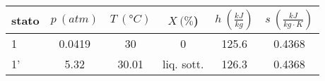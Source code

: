 \begin{center}
    \begin{tabular}{l|c|c|c|c|c}
        stato    & $p\ (atm)$ & $T\ (\text{°}C) $&$X\ (\%$)& $h\ (\frac{kJ}{kg})$  & $s\ (\frac{kJ}{kg\cdot K})$\\ \hline
        1   &        0.0419 &            30   &    0      & 125.6    &0.4368 \\ \hline     %
        1'  &        5.32    &           30.01   &liq. sott.  & 126.3&0.4368 \\ \hline      %
    \end{tabular}
\end{center}
